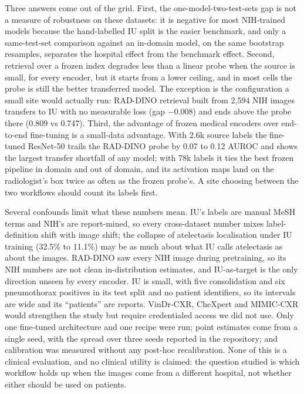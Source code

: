 \documentclass[conference]{IEEEtran}
\begin{document}
Three answers come out of the grid. First, the one-model-two-test-sets gap is not a measure of robustness on these datasets: it is negative for most NIH-trained models because the hand-labelled IU split is the easier benchmark, and only a same-test-set comparison against an in-domain model, on the same bootstrap resamples, separates the hospital effect from the benchmark effect. Second, retrieval over a frozen index degrades less than a linear probe when the source is small, for every encoder, but it starts from a lower ceiling, and in most cells the probe is still the better transferred model. The exception is the configuration a small site would actually run: RAD-DINO retrieval built from 2,594 NIH images transfers to IU with no measurable loss (gap $-0.008$) and ends above the probe there (0.809 vs 0.747). Third, the advantage of frozen medical encoders over end-to-end fine-tuning is a small-data advantage. With 2.6k source labels the fine-tuned ResNet-50 trails the RAD-DINO probe by 0.07 to 0.12 AUROC and shows the largest transfer shortfall of any model; with 78k labels it ties the best frozen pipeline in domain and out of domain, and its activation maps land on the radiologist's box twice as often as the frozen probe's. A site choosing between the two workflows should count its labels first.

Several confounds limit what these numbers mean. IU's labels are manual MeSH terms and NIH's are report-mined, so every cross-dataset number mixes label-definition shift with image shift; the collapse of atelectasis localisation under IU training (32.5\% to 11.1\%) may be as much about what IU calls atelectasis as about the images. RAD-DINO saw every NIH image during pretraining, so its NIH numbers are not clean in-distribution estimates, and IU-as-target is the only direction unseen by every encoder. IU is small, with five consolidation and six pneumothorax positives in its test split and no patient identifiers, so its intervals are wide and its ``patients'' are reports. VinDr-CXR, CheXpert and MIMIC-CXR would strengthen the study but require credentialed access we did not use. Only one fine-tuned architecture and one recipe were run; point estimates come from a single seed, with the spread over three seeds reported in the repository; and calibration was measured without any post-hoc recalibration. None of this is a clinical evaluation, and no clinical utility is claimed: the question studied is which workflow holds up when the images come from a different hospital, not whether either should be used on patients.
\end{document}

